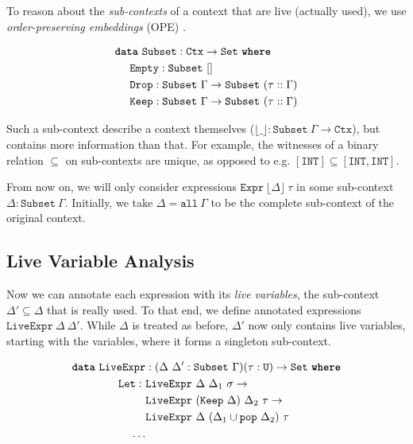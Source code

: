 \documentclass[sigplan,nonacm,screen,review,timestamp]{acmart}
\newcommand{\I}[1]{\texttt{#1}\xspace}
\newcommand{\K}[1]{\textbf{\texttt{#1}}\xspace}
\newcommand{\Floor}[1]{\lfloor #1 \rfloor\xspace}
\begin{document}
To reason about the \emph{sub-contexts} of a context that are live (actually used),
we use \emph{order-preserving embeddings} (OPE) \cite{chapman2009type}.

\begin{align*}
  &\K{data}\ \I{Subset} : \I{Ctx} \to \I{Set}\ \K{where}          \\
  &\ \ \ \ \I{Empty} : \I{Subset}\ []                                    \\
  &\ \ \ \ \I{Drop}  : \I{Subset}\ \Gamma \to \I{Subset}\ (\tau :: \Gamma)  \\
  &\ \ \ \ \I{Keep}  : \I{Subset}\ \Gamma \to \I{Subset}\ (\tau :: \Gamma)
\end{align*}

Such a sub-context describe a context themselves
($\Floor{\_} : \I{Subset}\ \Gamma \to \I{Ctx}$),
but contains more information than that.
For example, the witnesses of a binary relation $\subseteq$ on sub-contexts are unique,
as opposed to e.g. $[\I{INT}] \subseteq [\I{INT}, \I{INT}]$.

From now on, we will only consider expressions
$\I{Expr}\ \Floor{\Delta}\ \tau$ in some sub-context $\Delta : \I{Subset}\ \Gamma$.
Initially, we take $\Delta = \I{all}\ \Gamma$ to be the complete sub-context of the original context.

\subsection{Live Variable Analysis}

Now we can annotate each expression with its \emph{live variables},
the sub-context $\Delta' \subseteq \Delta$ that is really used.
To that end, we define annotated expressions $\I{LiveExpr}\ \Delta\ \Delta'$.
While $\Delta$ is treated as before, $\Delta'$ now only contains live variables,
starting with the variables, where it forms a singleton sub-context.

\begin{align*}
  \K{data}\ \I{LiveExpr}& : (\Delta\ \Delta' : \I{Subset}\ \Gamma) (\tau : \I{U}) \to \I{Set}\ \K{where} \\
  \I{Let}
    :\ &\I{LiveExpr}\ \Delta\ \Delta_1\ \sigma \to  \\
       &\I{LiveExpr}\ (\I{Keep}\ \Delta)\ \Delta_2\ \tau \to  \\
       &\I{LiveExpr}\ \Delta\ (\Delta_1 \cup \I{pop}\ \Delta_2)\ \tau \\
  \ldots&
\end{align*}
\end{document}
